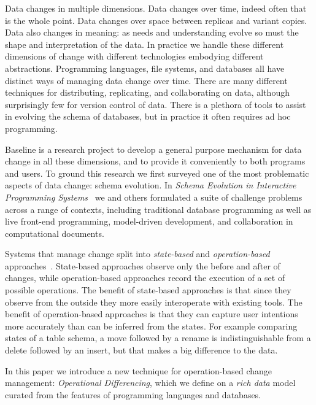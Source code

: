 \documentclass[english,submission]{programming}
\theoremstyle{definition}
\begin{document}
Data changes in multiple dimensions. Data changes over time, indeed often that is the whole point. Data changes over space between replicas and variant copies. Data also changes in meaning: as needs and understanding evolve so must the shape and interpretation of the data. In practice we handle these different dimensions of change with different technologies embodying different abstractions. Programming languages, file systems, and databases all have distinct ways of managing data change over time. There are many different techniques for distributing, replicating, and collaborating on data, although surprisingly few for version control of data. There is a plethora of tools to assist in evolving the schema of databases, but in practice it often requires ad hoc programming.

Baseline is a research project to develop a general purpose mechanism for data change in all these dimensions, and to provide it conveniently to both programs and users.
To ground this research we first surveyed one of the most problematic aspects of data change: schema evolution. In \textit{Schema Evolution in Interactive Programming Systems}~\cite{challenge-problems} we and others formulated a suite of challenge problems across a range of contexts, including traditional database programming as well as live front-end programming, model-driven development, and collaboration in computational documents.

Systems that manage change split into \textit{state-based} and \textit{operation-based} approaches~\cite{diff3, Shapiro11}. State-based approaches observe only the before and after of changes, while operation-based approaches record the execution of a set of possible operations.
The benefit of state-based approaches is that since they observe from the outside they more easily interoperate with existing tools.
The benefit of operation-based approaches is that they can capture user intentions more accurately than can be inferred from the states. For example comparing states of a table schema, a move followed by a rename is indistinguishable from a delete followed by an insert, but that makes a big difference to the data.

In this paper we introduce a new technique for operation-based change management: \textit{Operational Differencing}, which we define on a \textit{rich data} model curated from the features of programming languages and databases.
\end{document}
